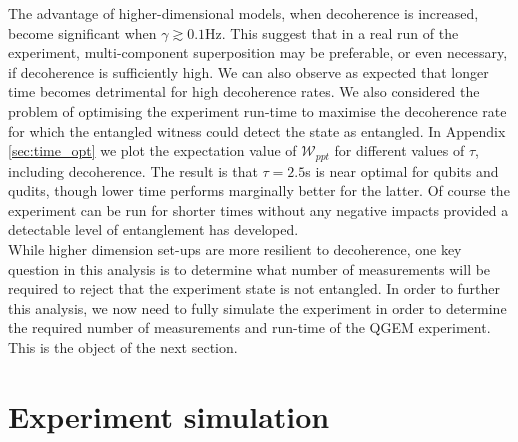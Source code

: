 \documentclass[%
 reprint,
 superscriptaddress,
 amsmath,
 amssymb,
 aps,
 longbibliography
]{revtex4-2}
\begin{document}
\indent The advantage of higher-dimensional models, when decoherence is increased, become significant when $\gamma\gtrsim0.1$Hz. This suggest that in a real run of the experiment, multi-component superposition may be preferable, or even necessary, if decoherence is sufficiently high. We can also observe as expected that longer time becomes detrimental for high decoherence rates. We also considered the problem of optimising the experiment run-time to maximise the decoherence rate for which the entangled witness could detect the state as entangled. In Appendix \ref{sec:time_opt} we plot the expectation value of $\mathcal{W}_{ppt}$ for different values of $\tau$, including decoherence. The result is that $\tau=2.5$s is near optimal for qubits and qudits, though lower time performs marginally better for the latter. Of course the experiment can be run for shorter times without any negative impacts provided a detectable level of entanglement has developed. \\
\indent While higher dimension set-ups are more resilient to decoherence, one key question in this analysis is to determine what number of measurements will be required to reject that the experiment state is not entangled. In order to further this analysis, we now need to fully simulate the experiment in order to determine the required number of measurements and run-time of the QGEM experiment. This is the object of the next section. 
\section{Experiment simulation\label{sec:expsim}}
\end{document}
